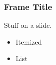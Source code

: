 \begin{frame}
  \frametitle{Frame Title}
  Stuff on a slide.
  \begin{itemize}
  \item Itemized
  \item List
  \end{itemize}
\end{frame}